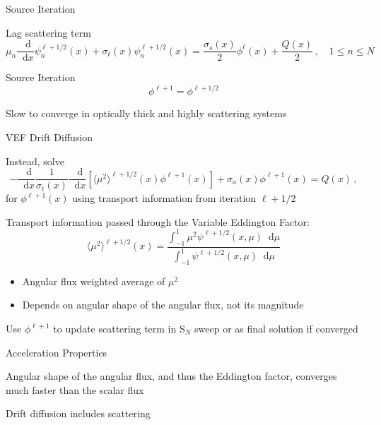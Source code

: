 \documentclass[10pt]{beamer}
\newcommand{\SN}{S$_N$\xspace}
\newcommand{\ud}{\mathop{}\!\mathrm{d}} %
\newcommand{\dderiv}[2]{\frac{\ud #1}{\ud #2}}
\newcommand{\edd}{\langle \mu^2 \rangle}
\newcommand{\relll}{^{\ell+1}} %
\newcommand{\rellh}{^{\ell+1/2}} %
\newcommand{\bracket}[1]{\left[ #1 \right]}
\begin{document}
\begin{frame}{Source Iteration}

	Lag scattering term 
	\begin{equation*} \label{eq:si}
		\mu_n \dderiv{}{x}\psi_n\rellh(x) + \sigma_t(x) \psi_n\rellh(x) = 
		\frac{\sigma_s(x)}{2} \phi^\ell(x) + \frac{Q(x)}{2} \,, \quad 1 \leq n \leq N 
	\end{equation*}

	\pause
	Source Iteration 
	\begin{equation*}
		\phi^{\ell+1} = \phi\rellh
	\end{equation*}

	\pause
	Slow to converge in optically thick and highly scattering systems 

\end{frame}

\begin{frame}{VEF Drift Diffusion}

	Instead, solve 
	\begin{equation*} \label{eq:drift}
	-\dderiv{}{x} \frac{1}{\sigma_t(x)} \dderiv{}{x} \bracket{\edd\rellh(x)\phi\relll(x)} + \sigma_a(x) \phi\relll(x) = Q(x) \,,
	\end{equation*}
	for $\phi\relll(x)$ using transport information from iteration $\ell+1/2$

	\pause 
	Transport information passed through the \alert{Variable Eddington Factor:}
	\begin{equation*} \label{eq:eddington} 
		\edd\rellh(x) = \frac{\int_{-1}^1 \mu^2 \psi\rellh(x, \mu) \ud \mu}{\int_{-1}^1 \psi\rellh(x, \mu) \ud \mu}
	\end{equation*}

	\begin{itemize}
		\pause
		\item Angular flux weighted average of $\mu^2$ 

		\pause
		\item Depends on angular shape of the angular flux, not its magnitude 
	\end{itemize}

	\pause
	Use $\phi\relll$ to update scattering term in \SN sweep or as final solution if converged 

\end{frame}

\begin{frame}{Acceleration Properties}

	Angular shape of the angular flux, and thus the Eddington factor, converges much faster than the scalar flux 

	Drift diffusion includes scattering 

\end{frame}
\end{document}
